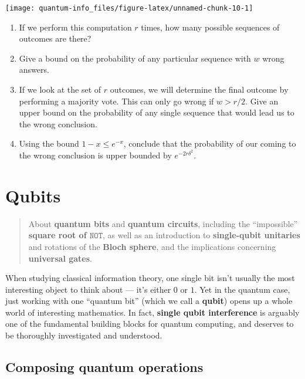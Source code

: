 \documentclass[fleqn]{article}
\providecommand{\tightlist}{%
  \setlength{\itemsep}{0pt}\setlength{\parskip}{0pt}}
\let\oldsection\section
\renewcommand\section{\clearpage\oldsection}
\begin{document}
\begin{center}\texttt{[image: quantum-info\_files/figure-latex/unnamed-chunk-10-1]} \end{center}

\begin{enumerate}
\def\labelenumi{\arabic{enumi}.}
\tightlist
\item
  If we perform this computation \(r\) times, how many possible sequences of outcomes are there?
\item
  Give a bound on the probability of any particular sequence with \(w\) wrong answers.
\item
  If we look at the set of \(r\) outcomes, we will determine the final outcome by performing a majority vote.
  This can only go wrong if \(w>r/2\).
  Give an upper bound on the probability of any single sequence that would lead us to the wrong conclusion.
\item
  Using the bound \(1-x\leqslant e^{-x}\), conclude that the probability of our coming to the wrong conclusion is upper bounded by \(e^{-2r\delta^2}\).
\end{enumerate}

\hypertarget{chapter2}{%
\section{Qubits}\label{chapter2}}

\begin{quote}
About \textbf{quantum bits} and \textbf{quantum circuits}, including the ``impossible'' \textbf{square root of \(\texttt{NOT}\)}, as well as an introduction to \textbf{single-qubit unitaries} and rotations of the \textbf{Bloch sphere}, and the implications concerning \textbf{universal gates}.
\end{quote}

When studying classical information theory, one single bit isn't usually the most interesting object to think about --- it's either \(0\) or \(1\).
Yet in the quantum case, just working with one ``quantum bit'' (which we call a \textbf{qubit}) opens up a whole world of interesting mathematics.
In fact, \textbf{single qubit interference} is arguably one of the fundamental building blocks for quantum computing, and deserves to be thoroughly investigated and understood.

\hypertarget{composing-quantum-operations}{%
\subsection{Composing quantum operations}\label{composing-quantum-operations}}
\end{document}
